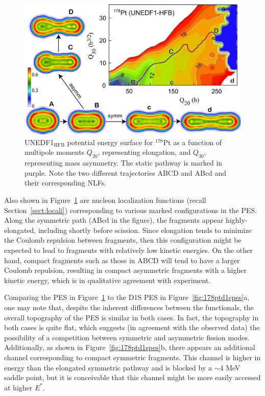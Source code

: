 \begin{figure}
	\centering
	\includegraphics[width=0.7\linewidth]{TeX_files/178Pt_unedf1_pes.jpg}
	\caption[UNEDF1$_\mathrm{HFB}$ potential energy surface for $^{178}$Pt as a function of multipole moments $Q_{20}$, representing elongation, and $Q_{30}$, representing mass asymmetry. The static pathway is marked in purple. Note the two different trajectories ABCD and ABcd and their corresponding NLFs.]{UNEDF1$_\mathrm{HFB}$ potential energy surface for $^{178}$Pt as a function of multipole moments $Q_{20}$, representing elongation, and $Q_{30}$, representing mass asymmetry. The static pathway is marked in purple. Note the two different trajectories ABCD and ABcd and their corresponding NLFs.}
	\label{fig:178ptunedf1pes}
\end{figure}

Also shown in Figure~\ref{fig:178ptunedf1pes} are nucleon localization functions (recall Section~\ref{sect:locali}) corresponding to various marked configurations in the PES. Along the symmetric path (ABcd in the figure), the fragments appear highly-elongated, including shortly before scission. Since elongation tends to minimize the Coulomb repulsion between fragments, then this configuration might be expected to lead to fragments with relatively low kinetic energies. On the other hand, compact fragments such as those in ABCD will tend to have a larger Coulomb repulsion, resulting in compact asymmetric fragments with a higher kinetic energy, which is in qualitative agreement with experiment.

Comparing the {\hfb} PES in Figure~\ref{fig:178ptunedf1pes} to the D1S PES in Figure~\ref{fig:178ptd1spes}a, one may note that, despite the inherent differences between the functionals, the overall topography of the PES is similar in both cases. In fact, the topography in both cases is quite flat, which suggests (in agreement with the observed data) the possibility of a competition between symmetric and asymmetric fission modes. Additionally, as shown in Figure~\ref{fig:178ptd1spes}b, there appears an additional channel corresponding to compact symmetric fragments. This channel is higher in energy than the elongated symmetric pathway and is blocked by a ${\sim}4$ MeV saddle point, but it is conceivable that this channel might be more easily accessed at higher $E^*$. %

